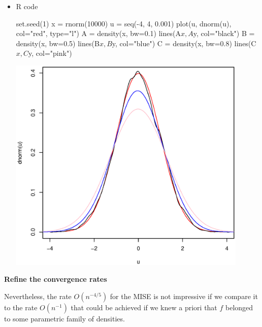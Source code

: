 \documentclass[19pt,landscape]{article}
\begin{document}
\begin{itemize}
\item R code
\begin{Sinput}
set.seed(1)
x = rnorm(10000)
u = seq(-4, 4, 0.001)
plot(u, dnorm(u), col="red", type="l")
A = density(x, bw=0.1)
lines(A$x, A$y, col="black")
B = density(x, bw=0.5)
lines(B$x, B$y, col="blue")
C = density(x, bw=0.8)
lines(C$x, C$y, col="pink")
\end{Sinput}
\includegraphics[width=0.9\textwidth,height=0.5\textwidth]{bias_kernel.eps}
\end{itemize}


\newpage
{\LARGE\centerline{\textbf{Refine the convergence rates}}}
\vskip15pt
    \large 
    \noindent
    Nevertheless, the rate $O(n^{-4/5})$ for the MISE is not impressive if we compare it to the rate $O(n^{-1})$ that could be achieved if we knew a priori that $f$ belonged to some parametric family of densities. 
\end{document}
